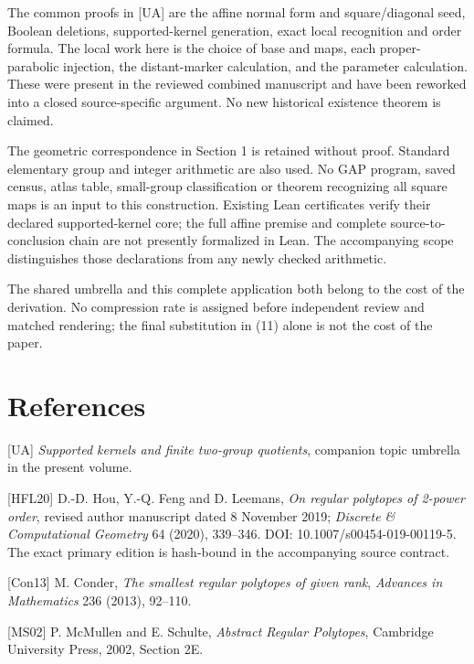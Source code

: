 The common proofs in {[}UA{]} are the affine normal form and
square/diagonal seed, Boolean deletions, supported-kernel generation,
exact local recognition and order formula. The local work here is the
choice of base and maps, each proper-parabolic injection, the
distant-marker calculation, and the parameter calculation. These were
present in the reviewed combined manuscript and have been reworked into
a closed source-specific argument. No new historical existence theorem
is claimed.

The geometric correspondence in Section 1 is retained without proof.
Standard elementary group and integer arithmetic are also used. No GAP
program, saved census, atlas table, small-group classification or
theorem recognizing all square maps is an input to this construction.
Existing Lean certificates verify their declared supported-kernel core;
the full affine premise and complete source-to-conclusion chain are not
presently formalized in Lean. The accompanying scope distinguishes those
declarations from any newly checked arithmetic.

The shared umbrella and this complete application both belong to the
cost of the derivation. No compression rate is assigned before
independent review and matched rendering; the final substitution in (11)
alone is not the cost of the paper.

\section*{References}
{[}UA{]} \emph{Supported kernels and finite two-group quotients},
companion topic umbrella in the present volume.

{[}HFL20{]} D.-D. Hou, Y.-Q. Feng and D. Leemans, \emph{On regular
polytopes of 2-power order}, revised author manuscript dated 8 November
2019; \emph{Discrete \& Computational Geometry} 64 (2020), 339--346.
DOI: 10.1007/s00454-019-00119-5. The exact primary edition is hash-bound
in the accompanying source contract.

{[}Con13{]} M. Conder, \emph{The smallest regular polytopes of given
rank}, \emph{Advances in Mathematics} 236 (2013), 92--110.

{[}MS02{]} P. McMullen and E. Schulte, \emph{Abstract Regular
Polytopes}, Cambridge University Press, 2002, Section 2E.

